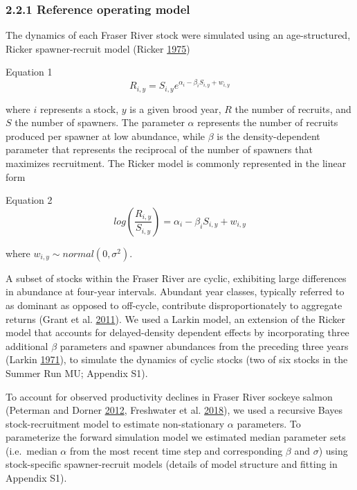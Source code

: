 \documentclass[11pt]{book}
\begin{document}
\subsubsection{2.2.1 Reference operating model}\label{reference-operating-model}

The dynamics of each Fraser River stock were simulated using an age-structured, Ricker spawner-recruit model (Ricker \protect\hyperlink{ref-Ricker1975}{1975})

Equation 1 \[R_{i,y} = S_{i,y} e^{\alpha_i - \beta_iS_{i,y} + w_{i,y}}\]

where \(i\) represents a stock, \(y\) is a given brood year, \(R\) the number of recruits, and \(S\) the number of spawners. The parameter \(\alpha\) represents the number of recruits produced per spawner at low abundance, while \(\beta\) is the density-dependent parameter that represents the reciprocal of the number of spawners that maximizes recruitment. The Ricker model is commonly represented in the linear form

Equation 2 \[log(\frac{R_{i,y}}{S_{i,y}}) = \alpha_i - \beta_iS_{i,y} + w_{i,y}\]

where \(w_{i,y} \sim normal(0, \sigma^2)\).

A subset of stocks within the Fraser River are cyclic, exhibiting large differences in abundance at four-year intervals. Abundant year classes, typically referred to as dominant as opposed to off-cycle, contribute disproportionately to aggregate returns (Grant et al. \protect\hyperlink{ref-Grant2011}{2011}). We used a Larkin model, an extension of the Ricker model that accounts for delayed-density dependent effects by incorporating three additional \(\beta\) parameters and spawner abundances from the preceding three years (Larkin \protect\hyperlink{ref-Larkin1971}{1971}), to simulate the dynamics of cyclic stocks (two of six stocks in the Summer Run MU; Appendix S1).

To account for observed productivity declines in Fraser River sockeye salmon (Peterman and Dorner \protect\hyperlink{ref-Peterman2012}{2012}, Freshwater et al. \protect\hyperlink{ref-Freshwater2018}{2018}), we used a recursive Bayes stock-recruitment model to estimate non-stationary \(\alpha\) parameters. To parameterize the forward simulation model we estimated median parameter sets (i.e.~median \(\alpha\) from the most recent time step and corresponding \(\beta\) and \(\sigma\)) using stock-specific spawner-recruit models (details of model structure and fitting in Appendix S1).
\end{document}
